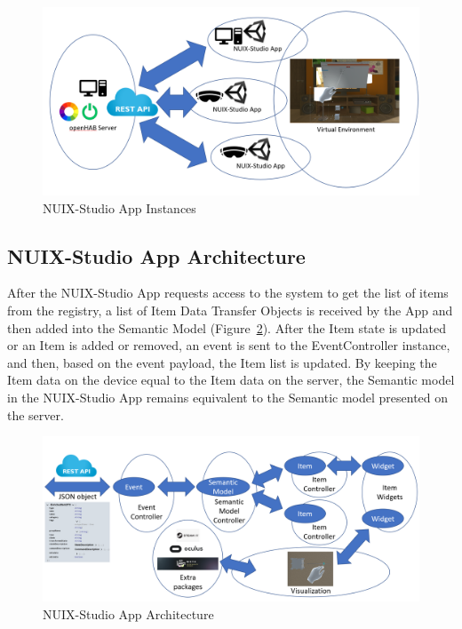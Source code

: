 \begin{figure}
  \centering
  \includegraphics[width=0.9\linewidth]{figures/AppInstances.png}
  \caption{NUIX-Studio App Instances}
  \label{fig:AppInstances-figure}
\end{figure}

\subsection{NUIX-Studio App Architecture}

After the NUIX-Studio App requests access to the system to get the list of items from the registry, a list of Item Data Transfer Objects is received by the App and then added into the Semantic Model (Figure~\ref{fig:AppArchitecture-figure}). After the Item state is updated or an Item is added or removed, an event is sent to the EventController instance, and then, based on the event payload, the Item list is updated.  By keeping the Item data on the device equal to the Item data on the server, the Semantic model in the NUIX-Studio App remains equivalent to the Semantic model presented on the server. 

\begin{figure}
  \centering
  \includegraphics[width=0.9\linewidth]{figures/AppArchitecture.png}
  \caption{NUIX-Studio App Architecture}
  \label{fig:AppArchitecture-figure}
\end{figure}

